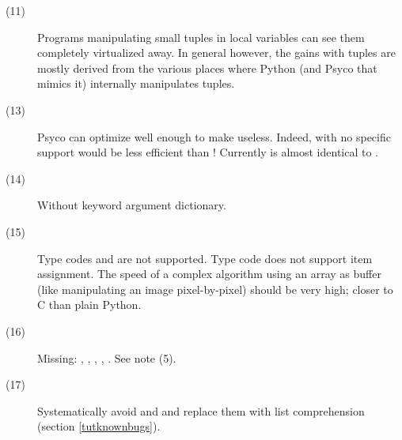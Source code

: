\documentclass{manual}
\begin{document}
\begin{description}
\item[(11)]
  Programs manipulating small tuples in local variables can see them completely virtualized away.  In general however, the gains with tuples are mostly derived from the various places where Python (and Psyco that mimics it) internally manipulates tuples.

\item[(13)]
  Psyco can optimize  well enough to make  useless.  Indeed, with no specific support  would be less efficient than ! Currently  is almost identical to .
  
\item[(14)]
  Without keyword argument dictionary.
  
\item[(15)]
  Type codes  and  are not supported.  Type code  does not support item assignment.  The speed of a complex algorithm using an array as buffer (like manipulating an image pixel-by-pixel) should be very high; closer to C than plain Python.

\item[(16)]
  Missing: , , , , .  See note (5).

\item[(17)]
  Systematically avoid  and  and replace them with list comprehension (section \ref{tutknownbugs}).

\end{description}


\end{document}
